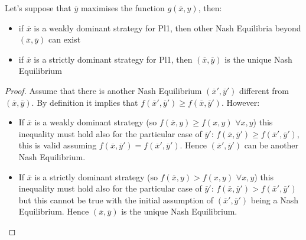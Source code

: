 \documentclass[../main.tex]{subfiles}
\begin{document}
\begin{theorem}
    Let's suppose that $\overline{y}$ maximises the function $g(\overline{x}, y)$, then:
    \begin{itemize}[noitemsep]
        \item if $\overline{x}$ is a weakly dominant strategy for Pl1, then other Nash Equilibria beyond $(\overline{x}, \overline{y})$ can exist
        \item if $\overline{x}$ is a strictly dominant strategy for Pl1, then $(\overline{x}, \overline{y})$ is the unique Nash Equilibrium
    \end{itemize}
\end{theorem}

\begin{proof}
    Assume that there is another Nash Equilibrium $(\overline{x}', \overline{y}')$ different from $(\overline{x}, \overline{y})$.
    By definition it implies that $f(\overline{x}', \overline{y}') \geq f(\overline{x}, \overline{y}')$. However:
    \begin{itemize}
        \item If $\overline{x}$ is a weakly dominant strategy (so $f(\overline{x}, y) \geq f(x, y)$ $\forall x, y$) this inequality must hold also for the particular case of $\overline{y}'$: $f(\overline{x}, \overline{y}') \geq f(\overline{x}', \overline{y}')$, this is valid assuming $f(\overline{x}, \overline{y}') = f(\overline{x}', \overline{y}')$. Hence $(\overline{x}', \overline{y}')$ can be another Nash Equilibrium.
        \item If $\overline{x}$ is a strictly dominant strategy (so $f(\overline{x}, y) > f(x, y)$ $\forall x, y$) this inequality must hold also for the particular case of $\overline{y}'$: $f(\overline{x}, \overline{y}') > f(\overline{x}', \overline{y}')$ but this cannot be true with the initial assumption of $(\overline{x}', \overline{y}')$ being a Nash Equilibrium. Hence $(\overline{x}, \overline{y})$ is the unique Nash Equilibrium.
    \end{itemize}
\end{proof}
\end{document}
